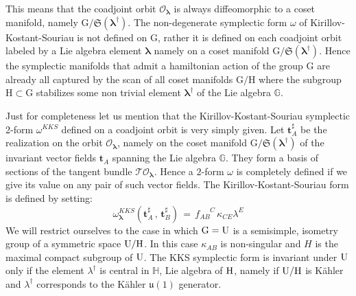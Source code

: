 \documentclass[10pt,a4paper]{article}
\begin{document}
This means that the coadjoint orbit $\mathcal{O}_{\boldsymbol{\lambda}}$ is always diffeomorphic to a coset manifold, namely
$\mathrm{G}/\mathfrak{S}(\boldsymbol{\lambda}^\dagger)$. The non-degenerate symplectic form $\omega$ of Kirillov-Kostant-Souriau is not defined on $\mathrm{G}$, rather it is defined on each coadjoint orbit labeled by a Lie algebra element $\boldsymbol{\lambda}$ namely on  a coset manifold $\mathrm{G}/\mathfrak{S}(\boldsymbol{\lambda}^\dagger)$. {Hence the symplectic manifolds that admit a hamiltonian
action of the group $\mathrm{G}$  are already all captured by the scan of all coset manifolds $\mathrm{G/H}$ where the subgroup $\mathrm{H}\subset \mathrm{G}$ stabilizes some non trivial element $\boldsymbol{\lambda}^\dagger$ of the Lie algebra $\mathbb{G}$.}
\par
Just for completeness let us mention that the Kirillov-Kostant-Souriau symplectic 2-form $\omega^{KKS}$ defined on a coadjoint orbit is very simply given. Let $\mathbf{t}^\sharp_A$ be the realization on the orbit $\mathcal{O}_{\boldsymbol{\lambda}}$, namely on the coset manifold $\mathrm{G}/\mathfrak{S}(\boldsymbol{\lambda}^\dagger)$ of the invariant vector fields $\mathbf{t}_A$ spanning the Lie algebra $\mathbb{G}$. They form a basis of sections of the tangent bundle $\mathcal{T}\mathcal{O}_{\boldsymbol{\lambda}}$. Hence a $2$-form $\omega$ is completely defined if we give its value on any pair of such vector fields. The Kirillov-Kostant-Souriau form is defined by setting:
\begin{equation}\label{KKSdefi}
  \omega^{KKS}_{\boldsymbol{\lambda}}\left(\mathbf{t}^\sharp_A\, , \,\mathbf{t}^\sharp_B \right) \, = \, f_{AB}^{\phantom{AB}C} \, \kappa_{CE} \lambda^E
\end{equation}
{We will restrict ourselves to the case in which ${\rm G=U}$ is a semisimple, isometry group of a symmetric space ${\rm U/H}$. In this case $\kappa_{AB}$ is non-singular and $H$ is the maximal compact subgroup of ${\rm U}$. The KKS symplectic form is invariant under ${\rm U}$ only if the element $\lambda^\dagger$ is central in $\mathbb{H}$, Lie algebra of ${\rm H}$, namely if ${\rm U/H}$ is K\"ahler and $\lambda^\dagger$ corresponds to the K\"ahler $\mathfrak{u}(1)$ generator.}
\end{document}
